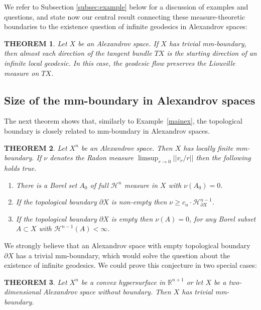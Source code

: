 \documentclass[12pt,leqno]{amsart}
\numberwithin{equation}{section}
\newtheorem{thm}{THEOREM}[section]
\theoremstyle{definition}
\theoremstyle{remark}
\newcommand{\exref}[1]{Example~\ref{#1}}
\newcommand{\R}{\mathbb{R}}
\begin{document}
We refer to Subsection \ref{subsec:example}  below for a discussion of  examples and questions, and
 state now our central  result connecting  these measure-theoretic boundaries to the existence question of infinite geodesics in Alexandrov spaces:

 \begin{thm} \label{thmmain}
 Let $X$ be an Alexandrov space. If $X$ has trivial mm-boundary, then  almost each direction of the tangent
 bundle $TX$ is the starting direction of  an infinite local geodesic. In this case, the geodesic flow preserves the Liouville measure on $TX$.
 \end{thm}

\subsection{Size of the mm-boundary in Alexandrov spaces}
The next theorem shows that, similarly to \exref{mainex},  the topological boundary is closely related to mm-boundary in Alexandrov spaces.

\begin{thm} \label{alexandrovthm}
Let $X^n$ be an Alexandrov space. Then $X$ has locally finite mm-boundary.
If $\nu$ denotes the Radon measure  $\limsup _{r\to 0} ||v_r /r||$ then the following holds true.
\begin{enumerate}
\item\label{full-measure-zero-nu}There is a Borel set $A_0$ of full $\mathcal H^n$ measure in $X$
with $\nu (A_0)=0$.
\item\label{bry-nu} If the topological boundary $\partial X$ is non-empty then $\nu \geq c_n \cdot \mathcal H^{n-1} _{\partial X}$.
\item \label{n-1-nu} If the topological boundary $\partial X$ is empty then $\nu (A)=0$, for any Borel subset $A\subset X$ with  $\mathcal H^{n-1} (A)<\infty$.
\end{enumerate}
\end{thm}

 We strongly believe that an Alexandrov space with empty topological boundary $\partial X$  has a trivial mm-boundary,
which would solve the question about the existence of infinite geodesics.
We could prove this conjecture in two special cases:



\begin{thm} \label{hypersurface}
Let $X^n$ be a convex hypersurface in $\R^{n+1}$  or let $X$ be a two-dimensional  Alexandrov space without boundary. Then $X$ has trivial mm-boundary.
\end{thm}
\end{document}
